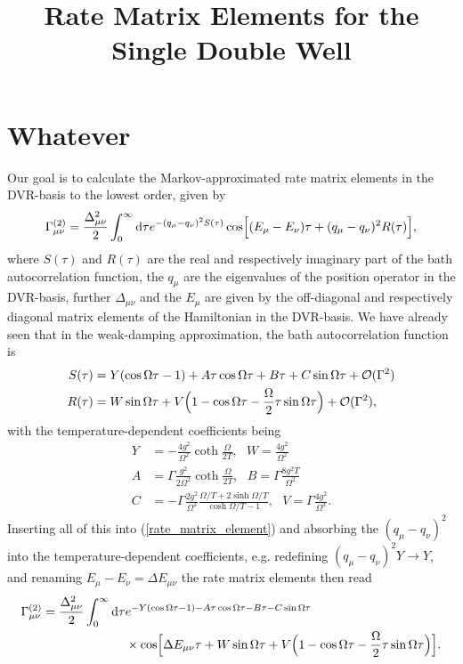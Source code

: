 \documentclass[11pt]{article}
\title{Rate Matrix Elements for the Single Double Well}
\begin{document}
\maketitle

\section{Whatever}

Our goal is to calculate the Markov-approximated rate matrix elements in
the DVR-basis to the lowest order, given by
%
\begin{equation}\label{rate_matrix_element}
    \Gamma_{\mu\nu}^{(2)} = \frac{\Delta_{\mu\nu}^2}{2}
    \int_{0}^{\infty}\text{d}\tau e^{-(q_\mu -q_\nu)^2 S(\tau)}
    \cos\Bigl[ (E_\mu-E_\nu)\tau +(q_\mu -q_\nu)^2 R(\tau)\Bigr],
\end{equation}
%
where $S(\tau)$ and $R(\tau)$ are the real and respectively imaginary part 
of the bath autocorrelation function, the $q_\mu$ are the eigenvalues of
the position operator in the DVR-basis, further $\Delta_{\mu\nu}$ and the 
$E_\mu$ are given by the off-diagonal and respectively diagonal matrix
elements of the Hamiltonian in the DVR-basis.
We have already seen that in the weak-damping approximation, the bath
autocorrelation function is
%
\begin{align}
    S(\tau)&= Y(\cos\Omega\tau-1)+A\tau\cos\Omega\tau+B\tau+C\sin\Omega\tau+\mathcal{O}(\Gamma^2)\\
    R(\tau)&= W\sin\Omega\tau+V\Bigl(1-\cos\Omega\tau-\frac{\Omega}{2}\tau\sin\Omega\tau\Bigr)+\mathcal{O}(\Gamma^2),
\end{align}
%
with the temperature-dependent coefficients being
%
\begin{align}
    Y&=-\frac{4g^2}{\Omega^2}\coth\frac{\Omega}{2T}, \ \ \ W=\frac{4g^2}{\Omega^2} \\
    A&=\Gamma\frac{g^2}{2\Omega^2}\coth\frac{\Omega}{2T}, \ \ \ B=\Gamma\frac{8g^2T}{\Omega^2} \\
    C&=-\Gamma\frac{2g^2}{\Omega^3}\frac{\Omega/T+2\sinh\Omega/T}{\cosh\Omega/T-1}, \ \ \ V=\Gamma\frac{4g^2}{\Omega^3}.
\end{align}
%
Inserting all of this into (\ref{rate_matrix_element}) and absorbing the 
$(q_\mu-q_\nu)^2$ into the temperature-dependent coefficients, e.g.
redefining $(q_\mu-q_\nu)^2Y\rightarrow Y$, and renaming $E_\mu-E_\nu=\Delta E_{\mu\nu}$
the rate matrix elements then read
%
\begin{equation}\label{rate_matrix_element_2}
\begin{split}
    \Gamma_{\mu\nu}^{(2)} =\frac{\Delta_{\mu\nu}^2}{2}
    \int_{0}^{\infty}\text{d}\tau &e^{-Y(\cos\Omega\tau-1)-A\tau\cos\Omega\tau-B\tau-C\sin\Omega\tau} \\
    & \times \cos\Bigl[\Delta E_{\mu\nu}\tau +W\sin\Omega\tau+V\Bigl(1-\cos\Omega\tau-\frac{\Omega}{2}\tau\sin\Omega\tau\Bigr)\Bigr].
\end{split}
\end{equation}
\end{document}
